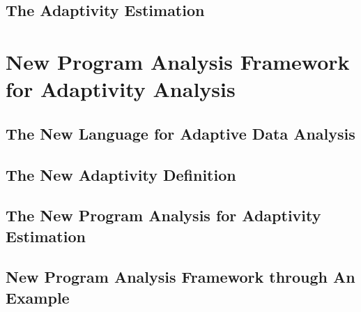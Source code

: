 \documentclass[a4paper,11pt]{article}
\begin{document}
\subsection{The Adaptivity Estimation}
\label{sec:prework-static}


\section{New Program Analysis Framework for Adaptivity Analysis }
\label{sec:adapt-analysis}
% 

\subsection{The New Language for Adaptive Data Analysis}
\label{sec:adapt-language}



\subsection{The New Adaptivity Definition}
\label{sec:adapt-exe}

% 

\subsection{The New Program Analysis for Adaptivity Estimation}
\label{sec:adapt-static}


\subsection{New Program Analysis Framework through An Example}
\label{sec:adapt-example}

\end{document}
